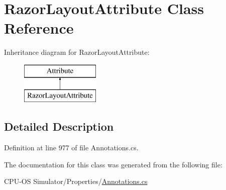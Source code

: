 \hypertarget{class_razor_layout_attribute}{}\section{Razor\+Layout\+Attribute Class Reference}
\label{class_razor_layout_attribute}
Inheritance diagram for Razor\+Layout\+Attribute\+:\begin{figure}[H]
\begin{center}
\leavevmode
\includegraphics[height=2.000000cm]{class_razor_layout_attribute}
\end{center}
\end{figure}


\subsection{Detailed Description}


Definition at line 977 of file Annotations.\+cs.



The documentation for this class was generated from the following file\+:\begin{DoxyCompactItemize}
\item 
C\+P\+U-\/\+O\+S Simulator/\+Properties/\hyperlink{_annotations_8cs}{Annotations.\+cs}\end{DoxyCompactItemize}
